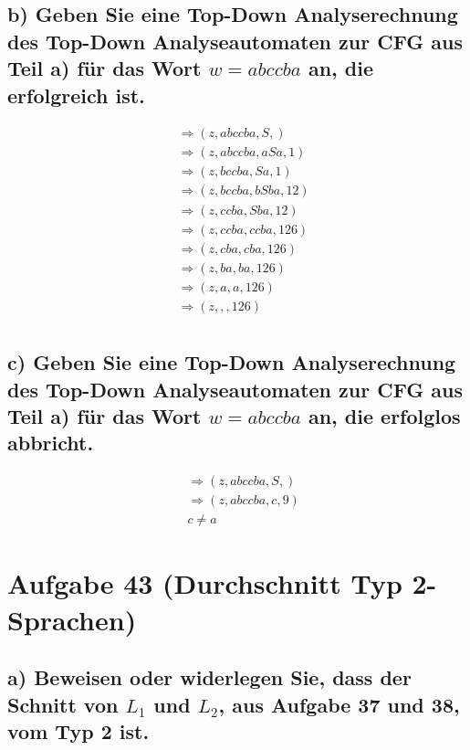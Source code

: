 \documentclass{article}
\begin{document}
\subsection*{b) Geben Sie eine Top-Down Analyserechnung des Top-Down Analyseautomaten zur CFG aus Teil a) für das Wort $w=abccba$ an, die erfolgreich ist.}

\begin{equation}
\begin{split}
&\Rightarrow(z, abccba, S, ) \\\ 
&\Rightarrow(z, abccba, aSa, 1) \\\ 
&\Rightarrow(z, bccba, Sa, 1) \\\ 
&\Rightarrow(z, bccba, bSba, 1 2) \\\ 
&\Rightarrow(z, ccba, Sba, 1 2) \\\
&\Rightarrow(z, ccba, ccba, 1 2 6) \\\
&\Rightarrow(z, cba, cba, 1 2 6) \\\
&\Rightarrow(z, ba, ba, 1 2 6) \\\
&\Rightarrow(z, a, a, 1 2 6) \\\
&\Rightarrow(z, , , 1 2 6) \\\
\end{split}
\end{equation}


\subsection*{c) Geben Sie eine Top-Down Analyserechnung des Top-Down Analyseautomaten zur CFG aus Teil a) für das Wort $w=abccba$ an, die erfolglos abbricht.}

\begin{equation}
\begin{split}
&\Rightarrow(z, abccba, S, ) \\\ 
&\Rightarrow(z, abccba, c, 9) \\\ 
&c \neq a
\end{split}
\end{equation}

\newpage
\section*{Aufgabe 43 (Durchschnitt Typ 2-Sprachen)}

\subsection*{a) Beweisen oder widerlegen Sie, dass der Schnitt von $L_1$ und $L_2$, aus Aufgabe 37 und 38, vom Typ 2 ist.}
\end{document}
